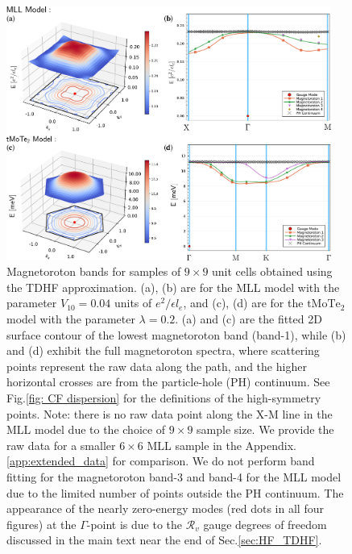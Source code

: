 \begin{figure}[htp!]
    \centering
    \includegraphics[width=0.95\textwidth]{figures/FCI/combined_tdhf_bands_and_surface_contour.pdf}
    \caption{Magnetoroton bands for samples of $9\times9$ unit cells obtained using the TDHF approximation. (a), (b) are for the MLL model with the parameter $V_{10}=0.04$ units of $e^2/\epsilon l_e$, and (c), (d) are for the $\mathrm{tMoTe_2}$ model with the parameter $\lambda=0.2$. (a) and (c) are the fitted 2D surface contour of the lowest magnetoroton band (band-1), while (b) and (d) exhibit the full magnetoroton spectra, where scattering points represent the raw data along the path, and the higher horizontal crosses are from the particle-hole (PH) continuum. See Fig.\ref{fig: CF dispersion} for the definitions of the high-symmetry points. Note: there is no raw data point along the $\mathrm{X}$-$\mathrm{M}$ line in the MLL model due to the choice of $9\times9$ sample size. We provide the raw data for a smaller $6\times6$ MLL sample in the Appendix. \ref{app:extended_data} for comparison. We do not perform band fitting for the magnetoroton band-3 and band-4 for the MLL model due to the limited number of points outside the PH continuum. The appearance of the nearly zero-energy modes (red dots in all four figures) at the $\Gamma$-point is due to the $\mathcal R_v$ gauge degrees of freedom discussed in the main text near the end of Sec.\ref{sec:HF_TDHF}.}
    \label{fig: magnetoroton spectrum}
\end{figure}

